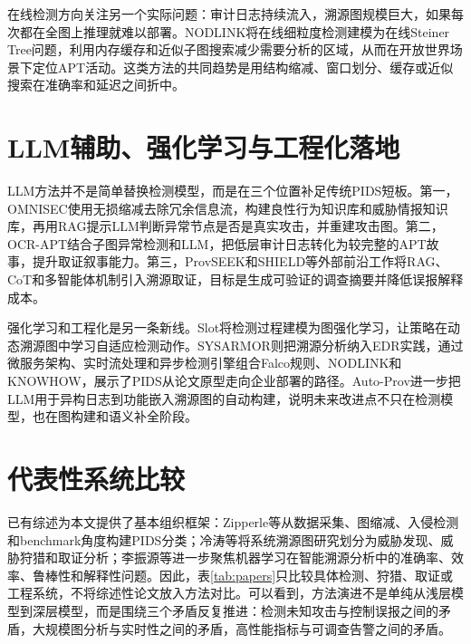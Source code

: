 在线检测方向关注另一个实际问题：审计日志持续流入，溯源图规模巨大，如果每次都在全图上推理就难以部署。NODLINK将在线细粒度检测建模为在线Steiner Tree问题，利用内存缓存和近似子图搜索减少需要分析的区域，从而在开放世界场景下定位APT活动\citep{nodlink2024}。这类方法的共同趋势是用结构缩减、窗口划分、缓存或近似搜索在准确率和延迟之间折中。

\section{LLM辅助、强化学习与工程化落地}

LLM方法并不是简单替换检测模型，而是在三个位置补足传统PIDS短板。第一，OMNISEC使用无损缩减去除冗余信息流，构建良性行为知识库和威胁情报知识库，再用RAG提示LLM判断异常节点是否是真实攻击，并重建攻击图\citep{omniseq2025}。第二，OCR-APT结合子图异常检测和LLM，把低层审计日志转化为较完整的APT故事，提升取证叙事能力\citep{ocrapt2025}。第三，ProvSEEK和SHIELD等外部前沿工作将RAG、CoT和多智能体机制引入溯源取证，目标是生成可验证的调查摘要并降低误报解释成本\citep{provseek2025,shield2025}。

强化学习和工程化是另一条新线。Slot将检测过程建模为图强化学习，让策略在动态溯源图中学习自适应检测动作\citep{slot2025}。SYSARMOR则把溯源分析纳入EDR实践，通过微服务架构、实时流处理和异步检测引擎组合Falco规则、NODLINK和KNOWHOW，展示了PIDS从论文原型走向企业部署的路径\citep{sysarmor2026}。Auto-Prov进一步把LLM用于异构日志到功能嵌入溯源图的自动构建，说明未来改进点不只在检测模型，也在图构建和语义补全阶段\citep{autoprov2026}。

\section{代表性系统比较}

已有综述为本文提供了基本组织框架：Zipperle等从数据采集、图缩减、入侵检测和benchmark角度构建PIDS分类\citep{zipperle2023survey}；冷涛等将系统溯源图研究划分为威胁发现、威胁狩猎和取证分析\citep{leng2022review}；李振源等进一步聚焦机器学习在智能溯源分析中的准确率、效率、鲁棒性和解释性问题\citep{li2025intelligent}。因此，表\ref{tab:papers}只比较具体检测、狩猎、取证或工程系统，不将综述性论文放入方法对比。可以看到，方法演进不是单纯从浅层模型到深层模型，而是围绕三个矛盾反复推进：检测未知攻击与控制误报之间的矛盾，大规模图分析与实时性之间的矛盾，高性能指标与可调查告警之间的矛盾。

